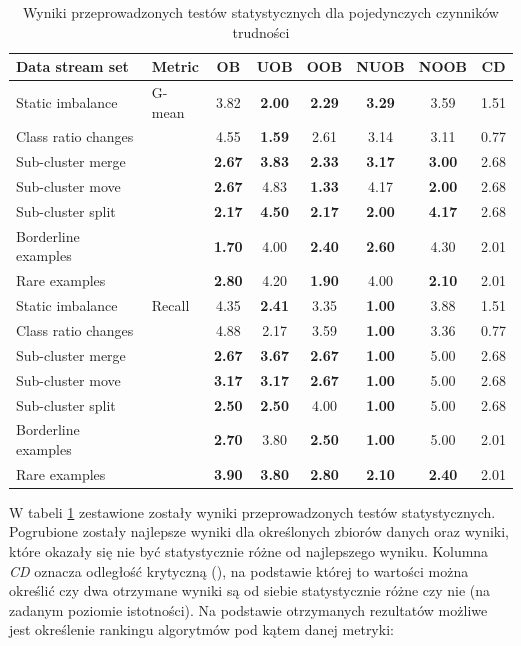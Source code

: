 \begin{table}[ht]
\centering\small%
\setlength{\tabcolsep}{10pt} 
\renewcommand{\arraystretch}{1.5} 
\begin{tabular}{l l c c c c c c}
\toprule
Data stream set & Metric & OB & UOB & OOB & NUOB & NOOB & CD \\
\midrule
Static imbalance & G-mean & 3.82 & \textbf{2.00} & \textbf{2.29} & \textbf{3.29} & 3.59 & 1.51 \\
Class ratio changes & & 4.55 & \textbf{1.59} & 2.61 & 3.14 & 3.11 & 0.77 \\
Sub-cluster merge & & \textbf{2.67} & \textbf{3.83} & \textbf{2.33} & \textbf{3.17} & \textbf{3.00} & 2.68 \\
Sub-cluster move & & \textbf{2.67} & 4.83 & \textbf{1.33} & 4.17 & \textbf{2.00} & 2.68 \\
Sub-cluster split & & \textbf{2.17} & \textbf{4.50} & \textbf{2.17} & \textbf{2.00} & \textbf{4.17} & 2.68 \\
Borderline examples & & \textbf{1.70} & 4.00 & \textbf{2.40} & \textbf{2.60} & 4.30 & 2.01 \\
Rare examples & & \textbf{2.80} & 4.20 & \textbf{1.90} & 4.00 & \textbf{2.10} & 2.01 \\
Static imbalance & Recall & 4.35 & \textbf{2.41} & 3.35 & \textbf{1.00} & 3.88 & 1.51 \\
Class ratio changes & & 4.88 & 2.17 & 3.59 & \textbf{1.00} & 3.36 & 0.77 \\
Sub-cluster merge & & \textbf{2.67} & \textbf{3.67} & \textbf{2.67} & \textbf{1.00} & 5.00 & 2.68 \\
Sub-cluster move & & \textbf{3.17} & \textbf{3.17} & \textbf{2.67} & \textbf{1.00} & 5.00 & 2.68 \\
Sub-cluster split & & \textbf{2.50} & \textbf{2.50} & 4.00 & \textbf{1.00} & 5.00 & 2.68 \\
Borderline examples & & \textbf{2.70} & 3.80 & \textbf{2.50} & \textbf{1.00} & 5.00 & 2.01 \\
Rare examples & & \textbf{3.90} & \textbf{3.80} & \textbf{2.80} & \textbf{2.10} & \textbf{2.40} & 2.01 \\
\bottomrule
\end{tabular}
\caption{Wyniki przeprowadzonych testów statystycznych dla pojedynczych czynników trudności}\label{Tab:SingleDriftFriedman}
\end{table}

\noindent W tabeli \ref{Tab:SingleDriftFriedman} zestawione zostały wyniki przeprowadzonych testów statystycznych. Pogrubione zostały najlepsze wyniki dla określonych zbiorów danych oraz wyniki, które okazały się nie być statystycznie różne od najlepszego wyniku. Kolumna \textit{CD} oznacza odległość krytyczną (), na podstawie której to wartości można określić czy dwa otrzymane wyniki są od siebie statystycznie różne czy nie (na zadanym poziomie istotności). Na podstawie otrzymanych rezultatów możliwe jest określenie rankingu algorytmów pod kątem danej metryki:

